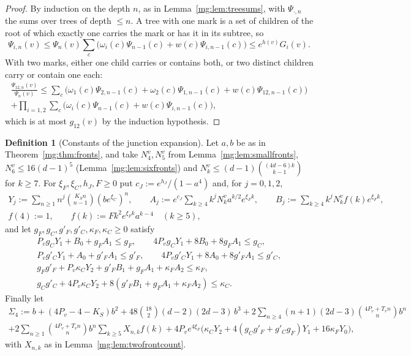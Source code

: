 \documentclass[11pt,a4paper]{article}
\theoremstyle{definition}
\newtheorem{definition}[theorem]{Definition}
\theoremstyle{remark}
\begin{document}
\begin{proof}
By induction on the depth $n$, as in Lemma~\ref{mg:lem:treesums}, with $\Psi_{\cdot,n}$ the sums over trees of depth $\le n$. A tree with one mark is a
set of children of the root of which exactly one carries the mark or has it in its subtree, so
\[
\Psi_{i,n}(v)\le\Psi_n(v)\sum_c\bigl(\omega_i(c)\Psi_{n-1}(c)+w(c)\Psi_{i,n-1}(c)\bigr)\le e^{h(v)}G_i(v).
\]
With two marks, either one child carries or contains both, or two distinct children carry or contain one each:
\begin{multline*}
\frac{\Psi_{12,n}(v)}{\Psi_n(v)}\le\sum_c\bigl(\omega_1(c)\Psi_{2,n-1}(c)+\omega_2(c)\Psi_{1,n-1}(c)+w(c)\Psi_{12,n-1}(c)\bigr)\\
+\prod_{i=1,2}\sum_c\bigl(\omega_i(c)\Psi_{n-1}(c)+w(c)\Psi_{i,n-1}(c)\bigr),
\end{multline*}
which is at most $g_{12}(v)$ by the induction hypothesis.
\end{proof}

\begin{definition}[Constants of the junction expansion]\label{mg:def:jconst}
Let $a,b$ be as in Theorem~\ref{mg:thm:fronts}, and take $N^v_4,N^v_5$ from Lemma~\ref{mg:lem:smallfronts}, $N^v_6\le16(d-1)^5$
(Lemma~\ref{mg:lem:sixfronts}) and $N^v_k\le(d-1)\binom{(4d-6)k}{k-1}$ for $k\ge7$. For $\xi_F,\xi_C,h_J,F\ge0$ put $c_J:=e^{h_J}/(1-a^4)$ and, for
$j=0,1,2$,
\begin{gather*}
Y_j:=\sum_{n\ge1}n^j\binom{K_Sn}{n-1}(be^{\xi_C})^n,\qquad A_j:=e^{c_J}\sum_{k\ge4}k^jN^v_ka^{k/2}e^{\xi_Fk},\qquad B_j:=\sum_{k\ge4}k^jN^v_kf(k)e^{\xi_Fk},\\
f(4):=1,\qquad f(k):=Fk^2e^{\xi_Fk}a^{k-4}\quad(k\ge5),
\end{gather*}
and let $g_F,g_C,g'_F,g'_C,\kappa_F,\kappa_C\ge0$ satisfy
\begin{gather*}
P_vg_CY_1+B_0+g_FA_1\le g_F,\qquad4P_vg_CY_1+8B_0+8g_FA_1\le g_C,\\
P_vg'_CY_1+A_0+g'_FA_1\le g'_F,\qquad4P_vg'_CY_1+8A_0+8g'_FA_1\le g'_C,\\
g_Fg'_F+P_v\kappa_CY_2+g'_FB_1+g_FA_1+\kappa_FA_2\le\kappa_F,\\
g_Cg'_C+4P_v\kappa_CY_2+8(g'_FB_1+g_FA_1+\kappa_FA_2)\le\kappa_C .
\end{gather*}
Finally let
\begin{multline*}
\Sigma_4:=b+(4P_v-4-K_S)b^2+48\binom{18}2(d-2)(2d-3)\,b^3+2\sum_{n\ge4}(n+1)(2d-3)\binom{4P_v+T_vn}{n}b^n\\
+2\sum_{n\ge1}\binom{4P_v+T_vn}{n}b^n\sum_{k\ge5}X_{n,k}f(k)
+4P_ve^{4\xi_F}\bigl(\kappa_CY_2+4(g_Cg'_F+g'_Cg_F)Y_1+16\kappa_FY_0\bigr),
\end{multline*}
with $X_{n,k}$ as in Lemma~\ref{mg:lem:twofrontcount}.
\end{definition}
\end{document}
